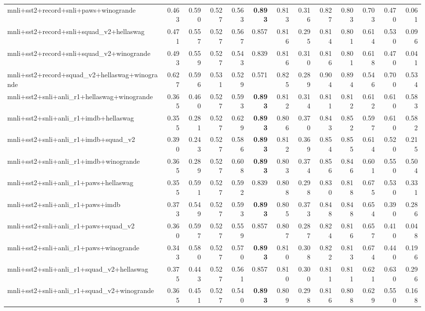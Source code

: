 \begin{table}[t]
\begin{tabular}{lrrrrrrrrrrrr}
    mnli+sst2+record+snli+paws+winogrande & 0.463 & 0.590 & 0.527 & 0.563 & \textbf{0.893} & 0.813 & 0.316 & 0.827 & 0.803 & 0.703 & 0.470 & 0.061 \\
    mnli+sst2+record+snli+squad\_v2+hellaswag & 0.471 & 0.557 & 0.527 & 0.567 & 0.857 & 0.816 & 0.295 & 0.814 & 0.801 & 0.614 & 0.530 & 0.096 \\
    mnli+sst2+record+snli+squad\_v2+winogrande & 0.493 & 0.559 & 0.527 & 0.543 & 0.839 & 0.816 & 0.310 & 0.816 & 0.801 & 0.618 & 0.470 & 0.041 \\
    mnli+sst2+record+squad\_v2+hellaswag+winogrande & 0.627 & 0.596 & 0.531 & 0.529 & 0.571 & 0.825 & 0.289 & 0.904 & 0.894 & 0.546 & 0.700 & 0.534 \\
    mnli+sst2+snli+anli\_r1+hellaswag+winogrande & 0.365 & 0.460 & 0.527 & 0.593 & \textbf{0.893} & 0.812 & 0.314 & 0.811 & 0.812 & 0.612 & 0.610 & 0.583 \\
    mnli+sst2+snli+anli\_r1+imdb+hellaswag & 0.355 & 0.281 & 0.527 & 0.629 & \textbf{0.893} & 0.806 & 0.370 & 0.843 & 0.852 & 0.597 & 0.610 & 0.582 \\
    mnli+sst2+snli+anli\_r1+imdb+squad\_v2 & 0.390 & 0.243 & 0.527 & 0.586 & \textbf{0.893} & 0.812 & 0.369 & 0.854 & 0.855 & 0.614 & 0.520 & 0.215 \\
    mnli+sst2+snli+anli\_r1+imdb+winogrande & 0.365 & 0.289 & 0.527 & 0.608 & \textbf{0.893} & 0.803 & 0.374 & 0.856 & 0.846 & 0.601 & 0.550 & 0.504 \\
    mnli+sst2+snli+anli\_r1+paws+hellaswag & 0.355 & 0.591 & 0.527 & 0.592 & 0.839 & 0.808 & 0.298 & 0.830 & 0.818 & 0.675 & 0.530 & 0.331 \\
    mnli+sst2+snli+anli\_r1+paws+imdb & 0.373 & 0.549 & 0.527 & 0.593 & \textbf{0.893} & 0.805 & 0.373 & 0.848 & 0.848 & 0.654 & 0.390 & 0.286 \\
    mnli+sst2+snli+anli\_r1+paws+squad\_v2 & 0.360 & 0.597 & 0.527 & 0.559 & 0.857 & 0.807 & 0.287 & 0.824 & 0.816 & 0.657 & 0.410 & 0.048 \\
    mnli+sst2+snli+anli\_r1+paws+winogrande & 0.343 & 0.580 & 0.527 & 0.570 & \textbf{0.893} & 0.810 & 0.308 & 0.822 & 0.813 & 0.674 & 0.440 & 0.196 \\
    mnli+sst2+snli+anli\_r1+squad\_v2+hellaswag & 0.375 & 0.443 & 0.527 & 0.561 & 0.857 & 0.810 & 0.300 & 0.811 & 0.811 & 0.621 & 0.630 & 0.296 \\
    mnli+sst2+snli+anli\_r1+squad\_v2+winogrande & 0.365 & 0.451 & 0.527 & 0.540 & \textbf{0.893} & 0.809 & 0.298 & 0.816 & 0.808 & 0.629 & 0.550 & 0.168 \\

\end{tabular}
\end{table}

